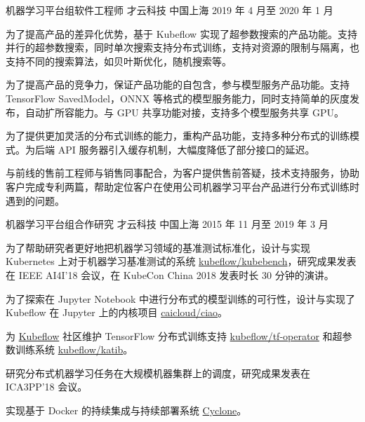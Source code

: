 \begin{cventries}
  \cventry
    {机器学习平台组软件工程师} %
    {才云科技} %
    {中国上海} %
    {2019 年 4 月至 2020 年 1 月} %
    {
      \begin{cvitems} %
        \item 为了提高产品的差异化优势，基于 Kubeflow 实现了超参数搜索的产品功能。支持并行的超参数搜索，同时单次搜索支持分布式训练，支持对资源的限制与隔离，也支持不同的搜索算法，如贝叶斯优化，随机搜索等。
        \item 为了提高产品的竞争力，保证产品功能的自包含，参与模型服务产品功能。支持 TensorFlow SavedModel，ONNX 等格式的模型服务能力，同时支持简单的灰度发布，自动扩所容能力。与 GPU 共享功能对接，支持多个模型服务共享 GPU。
        \item 为了提供更加灵活的分布式训练的能力，重构产品功能，支持多种分布式的训练模式。为后端 API 服务器引入缓存机制，大幅度降低了部分接口的延迟。
        \item 与前线的售前工程师与销售同事配合，为客户提供售前答疑，技术支持服务，协助客户完成专利两篇，帮助定位客户在使用公司机器学习平台产品进行分布式训练时遇到的问题。
      \end{cvitems}
    }

  \cventry
    {机器学习平台组合作研究} %
    {才云科技} %
    {中国上海} %
    {2015 年 11 月至 2019 年 3 月} %
    {
      \begin{cvitems} %
        \item 为了帮助研究者更好地把机器学习领域的基准测试标准化，设计与实现 Kubernetes 上对于机器学习基准测试的系统 \href{https://github.com/kubeflow/kubebench}{kubeflow/kubebench}，研究成果发表在 IEEE AI4I'18 会议，在 KubeCon China 2018 发表时长 30 分钟的演讲。
        \item 为了探索在 Jupyter Notebook 中进行分布式的模型训练的可行性，设计与实现了 Kubeflow 在 Jupyter 上的内核项目 \href{https://github.com/caicloud/ciao}{caicloud/ciao}。
        \item 为 \href{https://github.com/kubeflow/kubeflow}{Kubeflow} 社区维护 TensorFlow 分布式训练支持 \href{https://github.com/kubeflow/tf-operator}{kubeflow/tf-operator} 和超参数训练系统 \href{https://github.com/kubeflow/katib}{kubeflow/katib}。
        \item 研究分布式机器学习任务在大规模机器集群上的调度，研究成果发表在 ICA3PP'18 会议。
        \item 实现基于 Docker 的持续集成与持续部署系统 \href{https://github.com/caicloud/cyclone}{Cyclone}。
      \end{cvitems}
    }

\end{cventries}
